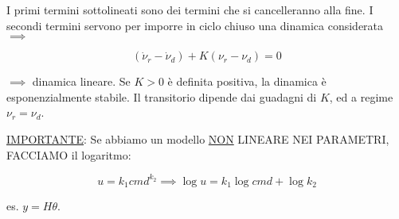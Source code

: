 I primi termini sottolineati sono dei termini che si cancelleranno alla fine. I secondi termini servono per imporre in ciclo chiuso una dinamica considerata $\implies$

\[
	(\dot{\nu}_r-\dot{\nu}_d) + K(\nu_r-\nu_d) = 0
\]

$\implies$ dinamica lineare. Se $K>0$ è definita positiva, la dinamica è esponenzialmente stabile. Il transitorio dipende dai guadagni di $K$, ed a regime $\nu_r=\nu_d$. 

\underline{IMPORTANTE}: Se abbiamo un modello \underline{NON} LINEARE NEI PARAMETRI, FACCIAMO il logaritmo:

\[
	u = k_1cmd^{k_2} \implies \log{u} = k_1\log{cmd} + \log{k_2}
\]

es. $y=H\theta$.